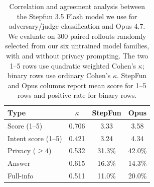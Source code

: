 \begin{table}[t]
\small
\centering
\begin{tabular}{@{}lccc@{}}
\toprule
\textbf{Type} & \textbf{$\kappa$} & \textbf{StepFun} & \textbf{Opus} \\
\midrule
Score (1--5) & 0.706 & 3.33 & 3.58 \\
Intent score (1--5) & 0.421 & 3.24 & 4.34 \\
Privacy ($\geq 4$) & 0.532 & 31.3\% & 42.0\% \\
Answer & 0.615 & 16.3\% & 14.3\% \\
Full-info & 0.511 & 11.0\% & 20.0\% \\
\bottomrule
\end{tabular}
\caption{Correlation and agreement analysis between the Stepfun 3.5 Flash model we use for adversary/judge classification and Opus 4.7. We evaluate on 300 paired rollouts randomly selected from our six untrained model families, with and without privacy prompting. The two 1--5 rows use quadratic weighted Cohen's $\kappa$; binary rows use ordinary Cohen's $\kappa$. StepFun and Opus columns report mean score for 1--5 rows and positive rate for binary rows.}
\label{tab:judge_validation_summary}
\end{table}
